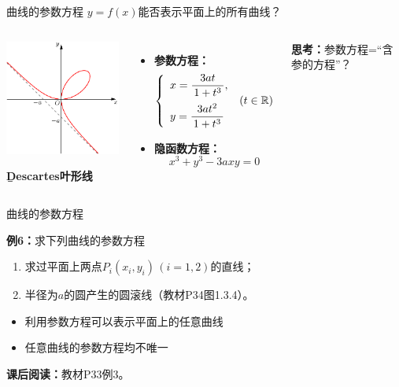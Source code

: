\begin{frame}{曲线的参数方程}
	\linespread{1.2}\pause 
	$y=f(x)$能否表示平面上的所有曲线？\pause 
	\vspace{-2em}
	\begin{columns}
			\begin{center}
				\includegraphics[width=5.5cm]{./images/ch1/dicartesCurve.pdf}
							
				{\small\bf\b Descartes叶形线}\pause
			\end{center}
			{\small
			\bigskip
			\begin{itemize}
			  \item {\bf 参数方程：}
			  	$$\left\{\begin{array}{l}
			  		x=\displaystyle\frac{\,{3at}\,}{\,{1+t^3}\,},\\[1em] y=\displaystyle\frac{\,{3at^2}\,}{\,{1+t^3}\,}
			  	\end{array}\right.\;(t\in\mathbb{R})$$\pause
			  	\vspace{-1em}
			  \item {\bf 隐函数方程：}
			  	$$x^3+y^3-3axy=0$$
			\end{itemize}
			\pause
			\vspace{-1em}
			\alert{{\bf 思考：}参数方程=“含参的方程”？}
			}
	\end{columns}
\end{frame}

\begin{frame}{曲线的参数方程}
	\linespread{1.5}\pause
	\begin{exampleblock}{{\bf 例6：}求下列曲线的参数方程}
		\begin{enumerate}
		  \item 求过平面上两点$P_i(x_i,y_i)\,(i=1,2)$的直线；\pause
		  \item 半径为$a$的圆产生的圆滚线（教材P34图1.3.4）。
		\end{enumerate}
	\end{exampleblock}\pause
	\begin{itemize}
	  \item \alert{利用参数方程可以表示平面上的任意曲线}\pause
	  \item \alert{任意曲线的参数方程均不唯一}\pause
	\end{itemize}
	\bigskip
	{\bf 课后阅读：}教材P33例3。
\end{frame}

